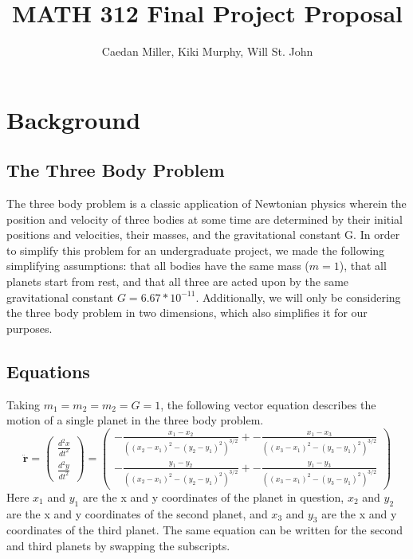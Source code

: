 \documentclass{article}
\author{Caedan Miller, Kiki Murphy, Will St. John}
\title{MATH 312 Final Project Proposal}
\begin{document}
\maketitle
\section{Background}
\subsection{The Three Body Problem}
The three body problem is a classic application of Newtonian physics wherein the position and velocity of three bodies at some time are determined by their initial positions and velocities, their masses, and the gravitational constant G. In order to simplify this problem for an undergraduate project, we made the following simplifying assumptions: that all bodies have the same mass ($m=1$), that all planets start from rest, and that all three are acted upon by the same gravitational constant $G=6.67*10^{-11}$. Additionally, we will only be considering the three body problem in two dimensions, which also simplifies it for our purposes. 


\subsection{Equations}
Taking $m_1=m_2=m_2=G=1$, the following vector equation describes the motion of a single planet in the three body problem.
$$\ddot{\bm{r}}=\left(\begin{array}{c}\frac{d^2x}{dt^2} \\ \frac{d^2y}{dt^2}\end{array}\right)=\left(\begin{array}{c}
    -\frac{x_1-x_2}{\left((x_2-x_1)^2 - (y_2-y_1)^2\right)^{3/2}} + -\frac{x_1-x_3}{\left((x_3-x_1)^2 - (y_3-y_1)^2\right)^{3/2}} \\
    -\frac{y_1-y_2}{\left((x_2-x_1)^2 - (y_2-y_1)^2\right)^{3/2}} + -\frac{y_1-y_3}{\left((x_3-x_1)^2 - (y_3-y_1)^2\right)^{3/2}}
\end{array}\right)$$
Here $x_1$ and $y_1$ are the x and y coordinates of the planet in question, $x_2$ and $y_2$ are the x and y coordinates of the second planet, and $x_3$ and $y_3$ are the x and y coordinates of the third planet. The same equation can be written for the second and third planets by swapping the subscripts.
\end{document}
